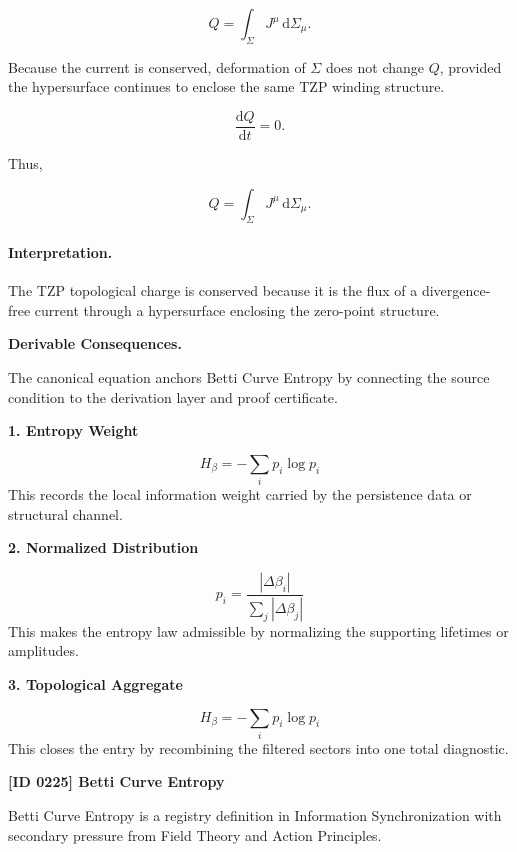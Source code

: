 \begin{equation}
Q
=
\int_{\Sigma}
J^\mu
\,\mathrm{d}\Sigma_\mu .
\end{equation}

Because the current is conserved, deformation of $\Sigma$ does not change $Q$, provided the hypersurface continues to enclose the same TZP winding structure.

\begin{equation}
\frac{\mathrm{d}Q}{\mathrm{d}t}=0 .
\end{equation}

Thus,

\begin{equation}
\boxed{
Q
=
\int_{\Sigma}
J^\mu
\,\mathrm{d}\Sigma_\mu .
}
\end{equation}

\paragraph{Interpretation.}
The TZP topological charge is conserved because it is the flux of a divergence-free current through a hypersurface enclosing the zero-point structure.

\par\vspace{0.35em}
\noindent\textbf{Derivable Consequences.}\quad
\begingroup
\footnotesize
\raggedright
The canonical equation anchors Betti Curve Entropy by connecting the source condition to the derivation layer and proof certificate.
\par\endgroup

\noindent\textbf{1. Entropy Weight}\par
\[
H_{\beta}=-\sum_i p_i\log p_i
\]
\noindent This records the local information weight carried by the persistence data or structural channel.\par
\noindent\textbf{2. Normalized Distribution}\par
\[
p_i=\frac{|\Delta\beta_i|}{\sum_j|\Delta\beta_j|}
\]
\noindent This makes the entropy law admissible by normalizing the supporting lifetimes or amplitudes.\par
\noindent\textbf{3. Topological Aggregate}\par
\[
H_{\beta}=-\sum_i p_i\log p_i
\]
\noindent This closes the entry by recombining the filtered sectors into one total diagnostic.\par

\clearpage
\noindent\textbf{[ID 0225] Betti Curve Entropy}\par
\vspace{0.35em}
\begingroup\small
{}
Betti Curve Entropy is a registry definition in Information Synchronization with secondary pressure from Field Theory and Action Principles.

